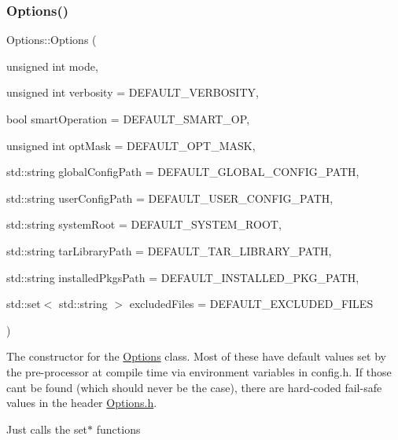 \subsubsection{\texorpdfstring{Options()}{Options()}}
{\footnotesize\ttfamily Options\+::\+Options (\begin{DoxyParamCaption}\item[{unsigned int}]{mode,  }\item[{unsigned int}]{verbosity = {\ttfamily DEFAULT\+\_\+VERBOSITY},  }\item[{bool}]{smart\+Operation = {\ttfamily DEFAULT\+\_\+SMART\+\_\+OP},  }\item[{unsigned int}]{opt\+Mask = {\ttfamily DEFAULT\+\_\+OPT\+\_\+MASK},  }\item[{std\+::string}]{global\+Config\+Path = {\ttfamily DEFAULT\+\_\+GLOBAL\+\_\+CONFIG\+\_\+PATH},  }\item[{std\+::string}]{user\+Config\+Path = {\ttfamily DEFAULT\+\_\+USER\+\_\+CONFIG\+\_\+PATH},  }\item[{std\+::string}]{system\+Root = {\ttfamily DEFAULT\+\_\+SYSTEM\+\_\+ROOT},  }\item[{std\+::string}]{tar\+Library\+Path = {\ttfamily DEFAULT\+\_\+TAR\+\_\+LIBRARY\+\_\+PATH},  }\item[{std\+::string}]{installed\+Pkgs\+Path = {\ttfamily DEFAULT\+\_\+INSTALLED\+\_\+PKG\+\_\+PATH},  }\item[{std\+::set$<$ std\+::string $>$}]{excluded\+Files = {\ttfamily DEFAULT\+\_\+EXCLUDED\+\_\+FILES} }\end{DoxyParamCaption})}



The constructor for the \mbox{\hyperlink{classOptions}{Options}} class. Most of these have default values set by the pre-\/processor at compile time via environment variables in config.\+h. If those can\textquotesingle{}t be found (which should never be the case), there are hard-\/coded fail-\/safe values in the header \mbox{\hyperlink{Options_8h}{Options.\+h}}. 

Just calls the set$\ast$ functions


